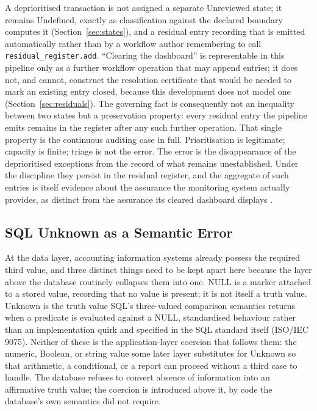 \documentclass[smallcondensed,envcountsect,natbib]{svjour3}
\newcommand{\state}[1]{\textsf{#1}}
\begin{document}
A deprioritised transaction is not assigned a separate \state{Unreviewed} state; it remains \state{Undefined}, exactly as classification against the declared boundary computes it (Section~\ref{sec:states}), and a residual entry recording that is emitted automatically rather than by a workflow author remembering to call \texttt{residual\_register.add}. ``Clearing the dashboard'' is representable in this pipeline only as a further workflow operation that may append entries; it does not, and cannot, construct the resolution certificate that would be needed to mark an existing entry closed, because this development does not model one (Section~\ref{sec:residuals}). The governing fact is consequently not an inequality between two states but a preservation property: every residual entry the pipeline emits remains in the register after any such further operation. That single property is the continuous auditing case in full. Prioritisation is legitimate; capacity is finite; triage is not the error. The error is the disappearance of the deprioritised exceptions from the record of what remains unestablished. Under the discipline they persist in the residual register, and the aggregate of such entries is itself evidence about the assurance the monitoring system actually provides, as distinct from the assurance its cleared dashboard displays \citep{alles2006, issa2016, austin2021}.

\subsection{SQL Unknown as a Semantic Error}
\label{sec:sql}

At the data layer, accounting information systems already possess the required third value, and three distinct things need to be kept apart here because the layer above the database routinely collapses them into one. \state{NULL} is a marker attached to a stored value, recording that no value is present; it is not itself a truth value. \state{Unknown} is the truth value SQL's three-valued comparison semantics returns when a predicate is evaluated against a \state{NULL}, standardised behaviour rather than an implementation quirk \citep{codd1979} and specified in the SQL standard itself (ISO/IEC 9075). Neither of these is the application-layer coercion that follows them: the numeric, Boolean, or string value some later layer substitutes for \state{Unknown} so that arithmetic, a conditional, or a report can proceed without a third case to handle. The database refuses to convert absence of information into an affirmative truth value; the coercion is introduced above it, by code the database's own semantics did not require.
\end{document}
